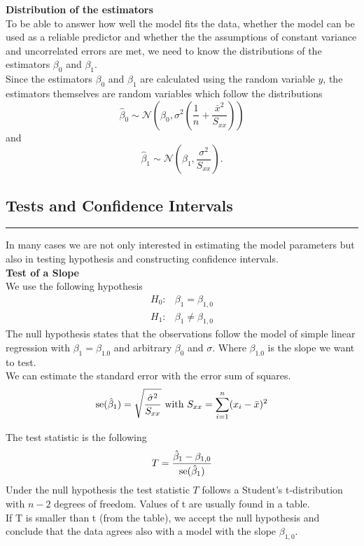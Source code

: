 \textbf{Distribution of the estimators}\\
To be able to answer how well the model fits the data, whether the model can be used as a reliable predictor and whether the the assumptions of constant variance and uncorrelated errors are met, we need to know the distributions of the estimators $\beta_0$ and $\beta_1$.\\
Since the estimators $\beta_0$ and $\beta_1$ are calculated using the random variable $y$, the estimators themselves are random variables which follow the distributions
\begin{equation}
  \hat{\beta}_0 \sim \mathcal{N}\left(\beta_0, \sigma^2\left(\frac{1}{n} + \frac{\bar{x}^2}{S_{xx}}\right)\right)
\end{equation}
and
\begin{equation}
  \hat{\beta}_1 \sim \mathcal{N}\left(\beta_1, \frac{\sigma^2}{S_{xx}}\right).
\end{equation}

\subsection{Tests and Confidence Intervals}
\noindent\rule[\linienAbstand]{\linewidth}{\linienDicke}
In many cases we are not only interested in estimating the model parameters but also in testing hypothesis and constructing confidence intervals.\\

\textbf{Test of a Slope}\\
We use the following hypothesis
\begin{equation}
  \begin{split}
    H_0:& \beta_1 = \beta_{1,0}\\
    H_1:& \beta_1 \neq \beta_{1,0}
  \end{split}
\end{equation}
The null hypothesis states that the observations follow the model of simple linear regression with $\beta_{1} = \beta_{1.0}$ and arbitrary $\beta_0$ and $\sigma$. Where $\beta_{1.0}$ is the slope we want to test.\\

We can estimate the standard error with the error sum of squares.
\begin{equation}
  \textup{se}(\hat{\beta}_1) = \sqrt{\frac{\hat{\sigma}^2}{S_{xx}}} \text{    with    } S_{xx} =  \sum^n_{i=1}(x_i - \bar{x})^2
\end{equation}

The test statistic is the following
\begin{equation}
  T = \frac{\hat{\beta}_1 - \beta_{1,0}}{\textup{se}(\hat{\beta}_1)}
  \label{eq:7.3.b}
\end{equation}
Under the null hypothesis the test statistic $T$ follows a Student’s t-distribution with $n - 2$ degrees of freedom. Values of t are usually found in a table.\\
If T is smaller than t (from the table), we accept the null hypothesis and conclude that the data agrees also with a model with the slope $\beta_{1,0}$.\\

